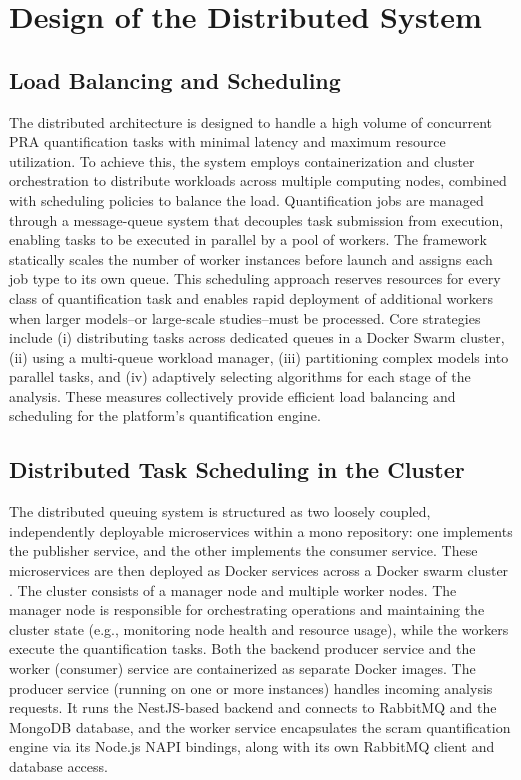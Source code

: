 {

\section{Design of the Distributed System}

\subsection{Load Balancing and Scheduling}

The distributed architecture is designed to handle a high volume of concurrent PRA quantification tasks with minimal latency and maximum resource utilization. To achieve this, the system employs containerization and cluster orchestration to distribute workloads across multiple computing nodes, combined with scheduling policies to balance the load. Quantification jobs are managed through a message-queue system that decouples task submission from execution, enabling tasks to be executed in parallel by a pool of workers. The framework statically scales the number of worker instances before launch and assigns each job type to its own queue. This scheduling approach reserves resources for every class of quantification task and enables rapid deployment of additional workers when larger models--or large-scale studies--must be processed. Core strategies include (i) distributing tasks across dedicated queues in a Docker Swarm cluster, (ii) using a multi-queue workload manager, (iii) partitioning complex models into parallel tasks, and (iv) adaptively selecting algorithms for each stage of the analysis. These measures collectively provide efficient load balancing and scheduling for the platform's quantification engine.

\subsection{Distributed Task Scheduling in the Cluster}

The distributed queuing system is structured as two loosely coupled, independently deployable microservices within a mono repository: one implements the publisher service, and the other implements the consumer service. These microservices are then deployed as Docker services across a Docker swarm cluster \cite{Swarm}. The cluster consists of a manager node and multiple worker nodes. The manager node is responsible for orchestrating operations and maintaining the cluster state (e.g., monitoring node health and resource usage), while the workers execute the quantification tasks. Both the backend producer service and the worker (consumer) service are containerized as separate Docker  images. The producer service (running on one or more instances) handles incoming analysis requests. It runs the NestJS-based backend \cite{Documentation} and connects to RabbitMQ \cite{RabbitMQ} and the MongoDB \cite{MongoDB} database, and the worker service encapsulates the scram \cite{scram} quantification engine via its Node.js NAPI \cite{Node} bindings, along with its own RabbitMQ client and database access.

}
